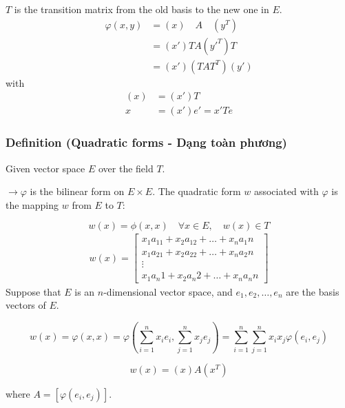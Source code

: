 $T$ is the transition matrix from the old basis to the new one in $E$.
\begin{align*} 
\varphi(x, y) &= (x) \quad A \quad (y^T)\\
&= (x') T A (y'^T) T \\
&= (x') (T A T^T) (y')
\end{align*}
with
\begin{align*}
   (x) &= (x')T\\
   x &= (x')e'=x'Te
\end{align*}


\subsubsection{Definition (Quadratic forms - Dạng toàn phương)}

Given vector space $E$ over the field $T$.

$\rightarrow\varphi$ is the bilinear form on $E \times E$.
The quadratic form $w$ associated with $\varphi$ is the mapping $w$ from $E$ to $T$:

\[
w(x) = \phi(x, x) \quad \forall x \in E, \quad w(x) \in T
\]
\begin{align*}
    w(x)=\begin{bmatrix}
        x_1a_11 + x_2a_12 + \ldots + x_na_1n\\
        x_1a_21 + x_2a_22 + \ldots + x_na_2n\\
        \vdots\\
        x_1a_n1 + x_2a_n2 + \ldots + x_na_nn
    \end{bmatrix}
\end{align*}
Suppose that $E$ is an $n$-dimensional vector space, and $e_1, e_2, \ldots, e_n$ are the basis vectors of $E$.

\[
w(x) = \varphi(x, x) = \varphi\left(\sum_{i=1}^n x_i e_i, \sum_{j=1}^n x_j e_j\right) = \sum_{i=1}^n \sum_{j=1}^n x_i x_j \varphi(e_i, e_j)
\]

\[
w(x) = (x) A (x^T)
\]


where $A = [\varphi(e_i, e_j)]$.

